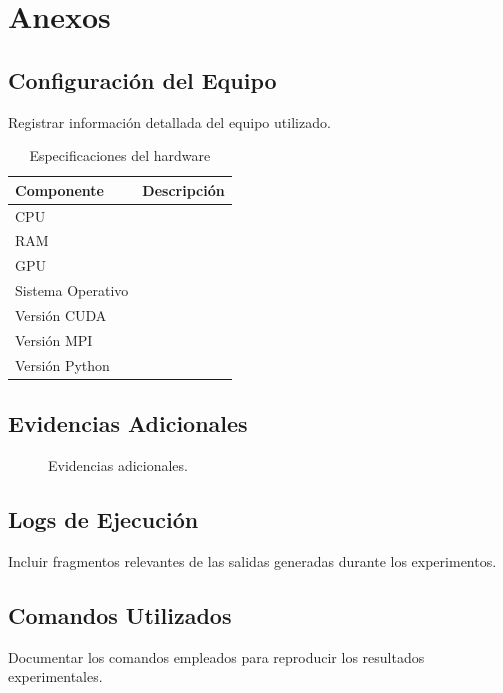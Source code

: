 \appendix

\chapter{Anexos}

\section{Configuración del Equipo}

Registrar información detallada del equipo utilizado.

\begin{table}[H]
\centering
\caption{Especificaciones del hardware}
\begin{tabular}{ll}
\toprule
Componente & Descripción \\
\midrule
CPU & \\
RAM & \\
GPU & \\
Sistema Operativo & \\
Versión CUDA & \\
Versión MPI & \\
Versión Python & \\
\bottomrule
\end{tabular}
\end{table}

\section{Evidencias Adicionales}

\begin{figure}[H]
\centering
{}
\caption{Evidencias adicionales.}
\end{figure}

\section{Logs de Ejecución}

Incluir fragmentos relevantes de las salidas generadas durante los experimentos.

\section{Comandos Utilizados}

Documentar los comandos empleados para reproducir los resultados experimentales.
